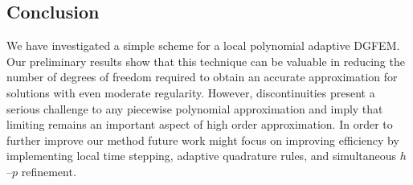 \documentclass[10]{amsart}
\begin{document}
\subsection{Conclusion}
We have investigated a simple scheme for a local polynomial adaptive DGFEM. Our preliminary results show that this technique can be valuable in reducing the number of degrees of freedom required to obtain an accurate approximation for solutions with even moderate regularity. However, discontinuities present a serious challenge to any piecewise polynomial approximation and imply that limiting remains an important aspect of high order approximation. In order to further improve our method future work might focus on improving efficiency by implementing local time stepping, adaptive quadrature rules, and simultaneous $h$--$p$ refinement.

\newpage


\end{document}
